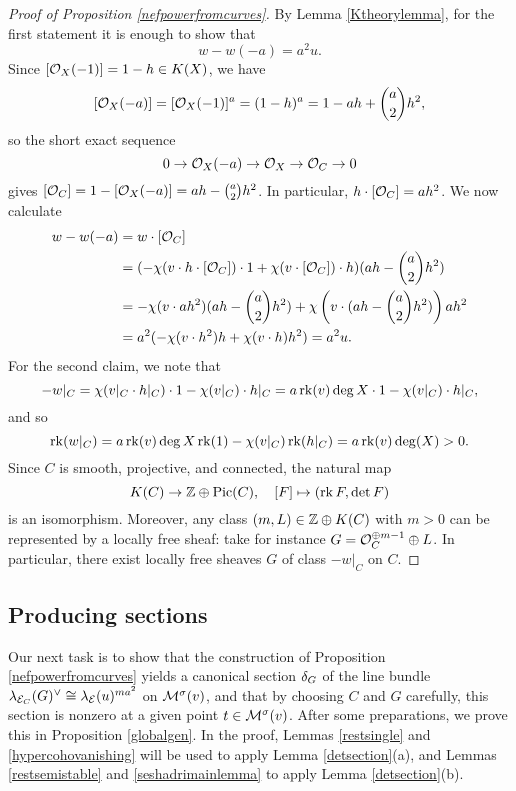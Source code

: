 \documentclass[letterpaper,12pt]{amsart}
\theoremstyle{remark}
\begin{document}
\begin{proof}[Proof of Proposition \ref{nefpowerfromcurves}]
    By Lemma \ref{Ktheorylemma}, for the first statement it is enough to show that
    \[ w - w(-a) = a^2 u. \]
    Since $[\mathcal{O}_X(-1)] = 1 - h \in K(X)$, we have
    \[ [\mathcal{O}_X(-a)] = [\mathcal{O}_X(-1)]^a = (1 - h)^a = 1 - a h + \binom{a}{2} h^2, \]
    so the short exact sequence
    \[ 0 \to \mathcal{O}_X(-a) \to \mathcal{O}_X \to \mathcal{O}_C \to 0 \]
    gives $[\mathcal{O}_C] = 1 - [\mathcal{O}_X(-a)] = a h - \binom{a}{2} h^2$. In particular, $h \cdot [\mathcal{O}_C] = a h^2$. We now calculate
    \begin{align*}
        w - w(-a) & = w \cdot [\mathcal{O}_C] \\
        & = (-\chi(v \cdot h \cdot [\mathcal{O}_C]) \cdot 1 + \chi(v \cdot [\mathcal{O}_C]) \cdot h) (a h - \binom{a}{2} h^2) \\
        & = - \chi(v \cdot ah^2) (a h - \binom{a}{2} h^2) + \chi\left(v \cdot (a h - \binom{a}{2} h^2)\right) a h^2 \\
        & = a^2 ( - \chi(v \cdot h^2) h + \chi(v \cdot h) h^2) = a^2 u.
    \end{align*}
    For the second claim, we note that 
    \[ -w|_C = \chi(v|_C \cdot h|_C) \cdot 1 - \chi(v|_C) \cdot h|_C = a \operatorname{\mathrm{rk}}(v) \deg X \cdot 1 - \chi(v|_C) \cdot h|_C, \]
    and so 
    \[ \operatorname{\mathrm{rk}}(w|_C) = a \operatorname{\mathrm{rk}}(v) \deg X \operatorname{\mathrm{rk}}(1) - \chi(v|_C) \operatorname{\mathrm{rk}}(h|_C) = a \operatorname{\mathrm{rk}}(v) \deg(X) > 0. \] 
    Since $C$ is smooth, projective, and connected, the natural map 
    \[ K(C) \to \mathbb{Z} \oplus \mathrm{Pic}(C), \quad [F] \mapsto (\operatorname{\mathrm{rk}} F, \det F) \] 
    is an isomorphism. Moreover, any class $(m, L) \in \mathbb{Z} \oplus K(C)$ with $m > 0$ can be represented by a locally free sheaf: take for instance $G = \mathcal{O}_C^{\oplus m-1} \oplus L$. In particular, there exist locally free sheaves $G$ of class $- w|_C$ on $C$.
\end{proof}

\subsection{Producing sections}
Our next task is to show that the construction of Proposition \ref{nefpowerfromcurves} yields a canonical section $\delta_G$ of the line bundle $\lambda_{\mathcal{E}_C}(G)^\vee \cong \lambda_{\mathcal{E}}(u)^{m a^2}$ on $\mathcal{M}^\sigma(v)$, and that by choosing $C$ and $G$ carefully, this section is nonzero at a given point $t \in \mathcal{M}^\sigma(v)$. After some preparations, we prove this in Proposition \ref{globalgen}. In the proof, Lemmas \ref{restsingle} and \ref{hypercohovanishing} will be used to apply Lemma \ref{detsection}(a), and Lemmas \ref{restsemistable} and \ref{seshadrimainlemma} to apply Lemma \ref{detsection}(b).
\end{document}
